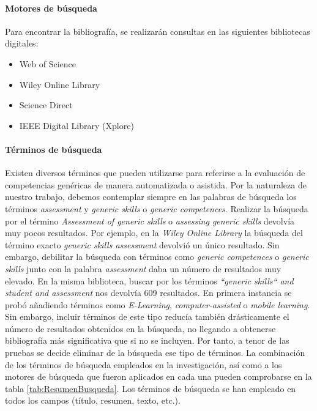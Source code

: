 
\paragraph*{Motores de búsqueda}
\label{sec:MotoresBusqueda}
Para encontrar la bibliografía, se realizarán consultas en las siguientes bibliotecas digitales: 
\begin{itemize}
\item Web of Science
\item Wiley Online Library
\item Science Direct
\item IEEE Digital Library (Xplore)
\end{itemize}

\paragraph*{Términos de búsqueda}
\label{sec:TerminosBusqueda}
Existen diversos términos que pueden utilizarse para referirse a la evaluación de competencias genéricas de manera automatizada o asistida. Por la naturaleza de nuestro trabajo, debemos contemplar siempre en las palabras de búsqueda los términos \emph{assessment} y \emph{generic skills} o \emph{generic competences}. Realizar la búsqueda por el término \emph{Assessment of generic skills} o \emph{assessing generic skills} devolvía muy pocos resultados. Por ejemplo, en la \emph{Wiley Online Library} la búsqueda del término exacto \emph{generic skills assessment} devolvió un único resultado. Sin embargo, debilitar la búsqueda con términos como \emph{generic competences} o \emph{generic skills} junto con la palabra \emph{assessment} daba un número de resultados muy elevado. En la misma biblioteca, buscar por los términos \emph{``generic skills`` and student and assessment} nos devolvía 609 resultados. En primera instancia se probó añadiendo términos como  \emph{E-Learning}, \emph{computer-assisted} o \emph{mobile learning}. Sin embargo, incluir términos de este tipo reducía también drásticamente el número de resultados obtenidos en la búsqueda, no llegando a obtenerse bibliografía más significativa que si no se incluyen. Por tanto, a tenor de las pruebas se decide eliminar de la búsqueda ese tipo de términos. La combinación de los términos de búsqueda empleados en la investigación, así como a los motores de búsqueda que fueron aplicados en cada una pueden comprobarse en la tabla \ref{tab:ResumenBusqueda}. Los términos de búsqueda se han empleado en todos los campos (título, resumen, texto, etc.).

